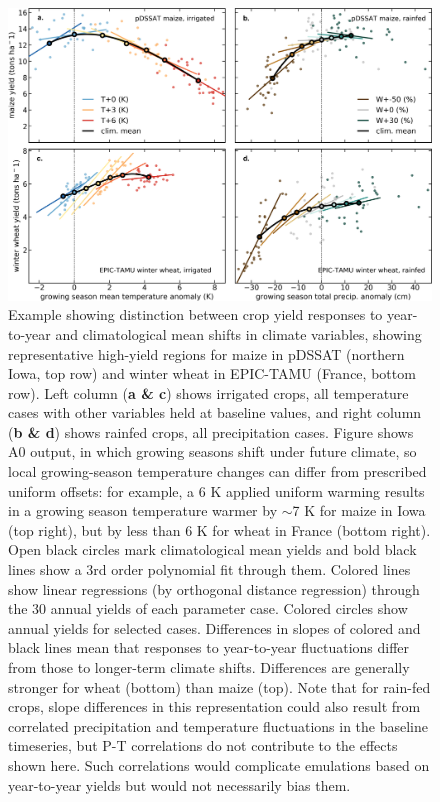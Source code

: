 \documentclass[gmdd]{copernicus} %
\begin{document}
\begin{figure}[ht]
\centering
   \includegraphics[width=15cm]{figures/phase_II_em_figure_1.png}
   \caption{
   Example showing distinction between crop yield responses to year-to-year and climatological mean shifts in climate variables, showing representative high-yield regions for maize in pDSSAT (northern Iowa, top row) and winter wheat in EPIC-TAMU (France, bottom row).
   Left column (\textbf{a \& c}) shows irrigated crops, all temperature cases
   with other variables held at baseline values, and right column (\textbf{b \& d}) shows rainfed crops, all precipitation cases.
   Figure shows A0 output, in which growing seasons shift under future climate, so local growing-season temperature changes can differ from prescribed uniform offsets: for example, a 6 K applied uniform warming results in a growing season temperature warmer by $\sim$7 K for maize in Iowa (top right), but by less than 6 K for wheat in France (bottom right). 
   Open black circles mark climatological mean yields and bold black lines show a 3rd order polynomial fit through them. 
   Colored lines show linear regressions (by orthogonal distance regression) through the 30 annual yields of each parameter case.
   Colored circles show annual yields for selected cases.
   Differences in slopes of colored and black lines mean that responses to year-to-year fluctuations differ from those to longer-term climate shifts. Differences are generally stronger for wheat (bottom) than maize (top).
   Note that for rain-fed crops, slope differences in this representation could also result from correlated precipitation and temperature fluctuations in the baseline timeseries, but P-T correlations do not contribute to the effects shown here. 
   Such correlations would complicate emulations based on year-to-year yields but would not necessarily bias them.
   }
   \label{fig:yearvclim}
\end{figure}
\end{document}
